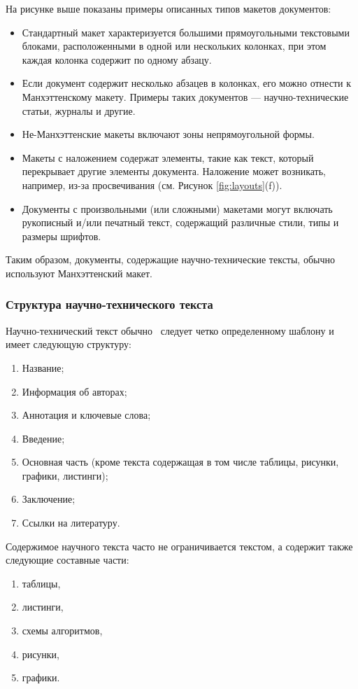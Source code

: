 На рисунке выше показаны примеры описанных типов макетов документов:
\begin{itemize}
    \item Стандартный макет характеризуется большими прямоугольными текстовыми блоками, расположенными в одной или нескольких колонках, при этом каждая колонка содержит по одному абзацу.
    \item Если документ содержит несколько абзацев в колонках, его можно отнести к Манхэттенскому макету.
Примеры таких документов --- научно-технические статьи, журналы и другие.
    \item Не-Манхэттенские макеты включают зоны непрямоугольной формы.
    \item Макеты с наложением содержат элементы, такие как текст, который перекрывает другие элементы документа.
Наложение может возникать, например, из-за просвечивания (см. Рисунок \ref{fig:layouts}(f)).
    \item Документы с произвольными (или сложными) макетами могут включать рукописный и/или печатный текст, содержащий различные стили, типы и размеры шрифтов.
\end{itemize}

Таким образом, документы, содержащие научно-технические тексты, обычно используют Манхэттенский макет.

\subsubsection{Структура научно-технического текста}

Научно-технический текст обычно~\cite{butenko2022, romanov2014, raitskaya2019} следует четко определенному шаблону и имеет следующую структуру:
\begin{enumerate}
    \item Название;
    \item Информация об авторах;
    \item Аннотация и ключевые слова;
    \item Введение;
    \item Основная часть (кроме текста содержащая в том числе таблицы, рисунки, графики, листинги);
    \item Заключение;
    \item Ссылки на литературу.
\end{enumerate}

Содержимое научного текста часто не ограничивается текстом, а содержит также следующие составные части:
\begin{enumerate}
    \item таблицы,
    \item листинги,
    \item схемы алгоритмов,
    \item рисунки,
    \item графики.
\end{enumerate}

